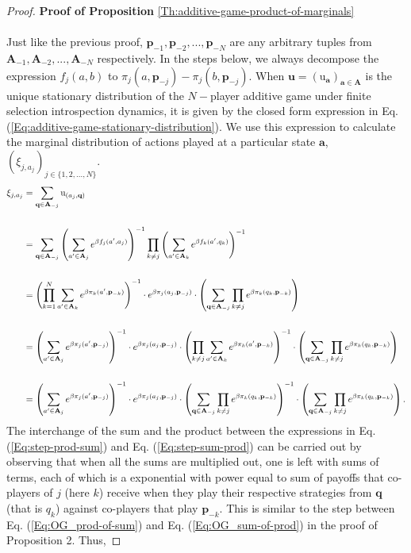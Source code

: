 \documentclass[11pt]{article}
\theoremstyle{plainCl1}
\theoremstyle{plainCl2}
\newcommand{\A}{\mathbf{A}}
\newcommand{\abf}{\mathbf{a}}
\newcommand{\qbf}{\mathbf{q}}
\newcommand{\pbf}{\mathbf{p}}
\newcommand{\ubf}{\mathbf{u}}
\begin{document}
\begin{proof}
\textbf{Proof of Proposition} \ref{Th:additive-game-product-of-marginals} \\ \\ 
Just like the previous proof, $\pbf_{-1}, \pbf_{-2},...,\pbf_{-N} $ are any arbitrary tuples from $\A_{-1}, \A_{-2},...,\A_{-N}$ respectively. In the steps below, we always decompose the expression $f_j(a,b)$ to $\pi_j(a,\pbf_{-j}) - \pi_j(b,\pbf_{-j})$. When $\ubf = (\mathrm{u}_\abf)_{\abf \in \A}$ is the unique stationary distribution of the $N-$player additive game under finite selection introspection dynamics, it is given by the closed form expression in Eq. (\ref{Eq:additive-game-stationary-distribution}). We use this expression to calculate the marginal distribution of actions played at a particular state $\abf$, $(\xi_{j,a_j})_{j \in \{1,2,...,N\}}$. 
\begin{align}
\xi_{j,a_j} &= \sum_{\qbf \in \A_{-j}} \mathrm{u}_{(a_j,\qbf)} \\ \notag \\
&= \sum_{\qbf \in \A_{-j}} \left( \sum_{a' \in \A_j} \displaystyle e^{\beta f_j(a',a_j)}\right)^{-1} \prod_{k \neq j} \left( \sum_{a' \in \A_k} \displaystyle e^{\beta f_k(a',q_k)}\right)^{-1} \\ \notag \\
&= \left( \prod_{k=1}^N \sum_{a' \in \A_k} \displaystyle e^{\beta \pi_k (a', \pbf_{-k})}\right)^{-1} \cdot \displaystyle e^{\beta \pi_j(a_j, \pbf_{-j})} \cdot \left( \sum_{\qbf \in \A_{-j}} \prod_{k \neq j} e^{\beta \pi_k(q_k, \pbf_{-k})} \right) \\ \notag \\
&= \left( \sum_{a' \in \A_j} \displaystyle e^{\beta \pi_j(a',\pbf_{-j})}\right)^{-1} \cdot \displaystyle e^{\beta \pi_j(a_j, \pbf_{-j})}\cdot \left( \prod_{k\neq j} \sum_{a' \in \A_k} \displaystyle e^{\beta \pi_k(a',\pbf_{-k})}\right)^{-1} \cdot \left( \sum_{\qbf \in \A_{-j}} \prod_{k \neq j} e^{\beta \pi_k(q_k,\pbf_{-k})} \right) \label{Eq:step-prod-sum} \\ \notag \\
&= \left( \sum_{a' \in \A_j} \displaystyle e^{\beta \pi_j(a',\pbf_{-j})}\right)^{-1} \cdot \displaystyle e^{\beta \pi_j(a_j, \pbf_{-j})}\cdot \left( \sum_{\qbf \in \A_{-j}} \prod_{k\neq j}  \displaystyle e^{\beta \pi_k(q_k,\pbf_{-k})} \right)^{-1} \cdot \left( \sum_{\qbf \in \A_{-j}} \prod_{k \neq j} e^{\beta \pi_k(q_k,\pbf_{-k})}  \right) \label{Eq:step-sum-prod}.
\end{align}
\noindent The interchange of the sum and the product between the expressions in Eq. (\ref{Eq:step-prod-sum}) and Eq. (\ref{Eq:step-sum-prod}) can be carried out by observing that when all the sums are multiplied out, one is left with sums of terms, each of which is a exponential with power equal to sum of payoffs that co-players of $j$ (here $k$) receive when they play their respective strategies from $\qbf$ (that is $q_k$) against co-players that play $\pbf_{-k}$. This is similar to the step between Eq. (\ref{Eq:OG_prod-of-sum}) and Eq. (\ref{Eq:OG_sum-of-prod}) in the proof of Proposition 2. Thus, 

\end{proof}
\end{document}
